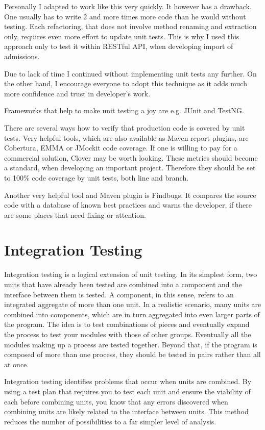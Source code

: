	Personally I adapted to work like this very quickly. It however has a drawback. One usually has to write 2 and more
	times more code than he would without testing. Each refactoring, that does not involve method renaming and extraction
	only, requires even more effort to update unit tests. This is why I used this approach only to test it within RESTful
	API, when developing import of admissions.
	
	Due to lack of time I continued without implementing unit tests any further. On the other hand, I encourage everyone to
	adopt this technique as it adds much more confidence and trust in developer's work.

	Frameworks that help to make unit testing a joy are e.g. JUnit and TestNG.
	
	There are several ways how to verify that production code is covered by unit tests. Very helpful tools, which are
	also available as Maven report plugins, are Cobertura, EMMA or JMockit code coverage. If one is willing to pay for a
	commercial solution, Clover may be worth looking. These metrics should become a standard, when developing an important
	project. Therefore they should be set to 100\% code coverage by unit tests, both line and branch.
	
	Another very helpful tool and Maven plugin is Findbugs. It compares the source code with a database of known best
	practices and warns the developer, if there are some places that need fixing or attention.

	\section{Integration Testing}
	
	\cite{msdnintegration}
	Integration testing is a logical extension of unit testing. In its simplest form, two units that have already been
	tested are combined into a component and the interface between them is tested. A component, in this sense, refers to an
	integrated aggregate of more than one unit. In a realistic scenario, many units are combined into components, which are
	in turn aggregated into even larger parts of the program. The idea is to test combinations of pieces and eventually
	expand the process to test your modules with those of other groups. Eventually all the modules making up a process are
	tested together. Beyond that, if the program is composed of more than one process, they should be tested in pairs
	rather than all at once.

	Integration testing identifies problems that occur when units are combined. By using a test plan that requires you to
	test each unit and ensure the viability of each before combining units, you know that any errors discovered when
	combining units are likely related to the interface between units. This method reduces the number of possibilities to a
	far simpler level of analysis.
	
